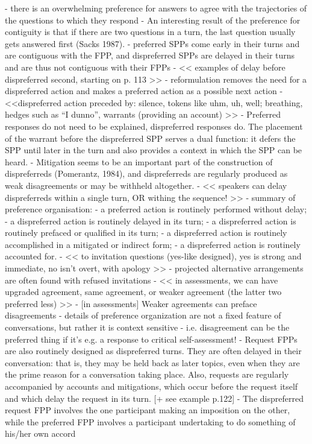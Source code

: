 \documentclass[11pt]{article}
\begin{document}
- there is an overwhelming preference for answers to agree with the trajectories of the questions to which they respond
- An interesting result of the preference for contiguity is that if there are two questions in a turn, the last question usually gets answered first (Sacks 1987).
- preferred SPPs come early in their turns and are contiguous with the FPP, and dispreferred SPPs are delayed in their turns and are thus not contiguous with their FPPs
- << examples of delay before dispreferred second, starting on p. 113 >>
- reformulation removes the need for a dispreferred action and makes a preferred action as a possible next action
- <<dispreferred action preceded by: silence, tokens like uhm, uh, well; breathing, hedges such as ``I dunno'', warrants (providing an account) >>
- Preferred responses do not need to be explained, dispreferred responses do. The placement of the warrant before the dispreferred SPP serves a dual function: it defers
the SPP until later in the turn and also provides a context in which the SPP can be heard.
- Mitigation seems to be an important part of the construction of dispreferreds (Pomerantz, 1984), and dispreferreds are regularly produced as weak disagreements or may be withheld altogether.
- << speakers can delay dispreferreds within a single turn, OR withing the sequence! >>
- summary of preference organisation:
	- a preferred action is routinely performed without delay;
	- a dispreferred action is routinely delayed in its turn;
	- a dispreferred action is routinely prefaced or qualified in its turn;
	- a dispreferred action is routinely accomplished in a mitigated or indirect form;
	- a dispreferred action is routinely accounted for.
- << to invitation questions (yes-like designed), yes is strong and immediate, no isn't overt, with apology >>
- projected alternative arrangements are often found with refused invitations
- << in assessments, we can have upgraded agreement, same agreement, or weaker agreement (the latter two preferred less) >>
- [in assessments] Weaker agreements can preface disagreements
- details of preference organization are not a fixed feature of conversations, but rather it is context sensitive
  - i.e. disagreement can be the preferred thing if it's e.g. a response to critical self-assessment!
- Request FPPs are also routinely designed as dispreferred turns. They are often delayed in their conversation: that is, they may be held back as later topics, even when they are the prime reason for a conversation taking place. Also, requests are regularly accompanied by accounts and mitigations, which occur before the request itself and which delay the request in its turn. [+ see example p.122]
  - The dispreferred request FPP involves the one participant making an imposition on the other, while the preferred FPP involves a participant undertaking to do something of his/her own accord
\end{document}
